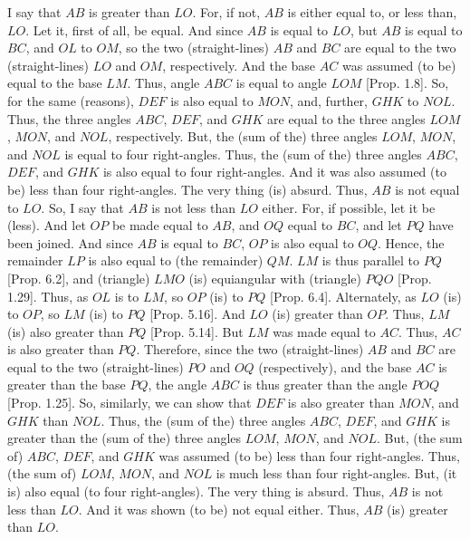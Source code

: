 \begin{Parallel}{}{}
{
\centerline{}

 I say that $AB$ is greater
than $LO$. For, if not, $AB$ is either equal to, or less than, $LO$.
Let it, first of all, be equal. And since $AB$ is equal to $LO$, but $AB$
is equal to $BC$, and $OL$ to $OM$, so the two (straight-lines)
$AB$ and $BC$ are equal to the two (straight-lines) $LO$ and $OM$, respectively. And the base $AC$ was assumed (to be) equal to the base
$LM$. Thus, angle $ABC$ is equal to angle $LOM$ [Prop. 1.8]. So, for the same (reasons), $DEF$ is also equal to $MON$,
and, further, $GHK$ to $NOL$. Thus, the three angles $ABC$, $DEF$,
and $GHK$ are equal to the three angles $LOM$, $MON$, and $NOL$,
respectively. But, the (sum of the) three angles $LOM$, $MON$,
and $NOL$ is equal to four right-angles. 
Thus, the (sum of the) three angles $ABC$, $DEF$, and $GHK$ is
also equal to four right-angles.
And it was also assumed (to be)
less than four right-angles. The very thing (is) absurd. Thus, $AB$
is not equal to $LO$. So, I say that $AB$ is not less than $LO$ either.
For, if possible, let it be (less). And let $OP$ be made equal to $AB$, and
$OQ$ equal to $BC$, and let $PQ$ have been joined. And since $AB$ is equal
to $BC$, $OP$ is also equal to $OQ$. Hence, the remainder $LP$ is also
equal to (the remainder) $QM$. $LM$ is thus parallel to $PQ$ [Prop. 6.2], and (triangle) $LMO$ (is) equiangular with (triangle) $PQO$
[Prop. 1.29]. 
Thus, as $OL$ is to $LM$, so $OP$ (is) to $PQ$ [Prop. 6.4]. Alternately, as $LO$ (is) to $OP$, so $LM$ (is) to $PQ$
[Prop. 5.16]. And $LO$ (is) greater than $OP$. 
Thus, $LM$ (is) also greater than $PQ$ [Prop. 5.14]. 
But $LM$ was made equal to $AC$. Thus, $AC$ is also greater than $PQ$. Therefore, since the two
(straight-lines) $AB$ and $BC$ are equal
to the two (straight-lines) $PO$ and $OQ$ (respectively), and the base $AC$ is greater
than the base $PQ$, the angle $ABC$ is thus greater than the
angle $POQ$ [Prop. 1.25]. So, similarly,
we can show that $DEF$ is also greater than $MON$, and $GHK$ than
$NOL$. Thus, the (sum of the) three angles $ABC$, $DEF$, and
$GHK$ is greater than the (sum of the) three angles $LOM$, $MON$, and
$NOL$. But, (the sum of) $ABC$, $DEF$, and $GHK$ was assumed (to be)
less than four right-angles. Thus, (the sum of) $LOM$, $MON$, and
$NOL$ is much less than four right-angles. But, (it is) also equal (to four right-angles). The very thing is absurd. Thus, $AB$ is not less than $LO$.
And it was shown (to be) not equal either. Thus, $AB$ (is) greater  than
$LO$.

}
\end{Parallel}

